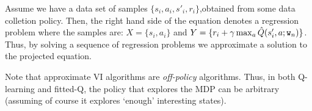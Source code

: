 Assume we have a data set of samples $\{s_i,a_i,s'_i,r_i\}$,obtained from some data colletion policy. Then, the right hand side of the equation denotes a regression problem where the samples are: $X = \{s_i,a_i\}$ and $Y = \{ r_i + \gamma \max_a \hat{Q}(s'_i, a;\texttt{w}_{n})\}$. Thus, by solving a sequence of regression problems we approximate a solution to the projected equation.

Note that approximate VI algorithms are \emph{off-policy} algorithms. Thus, in both Q-learning and fitted-Q, the policy that explores the MDP can be arbitrary (assuming of course it explores `enough' interesting states).
